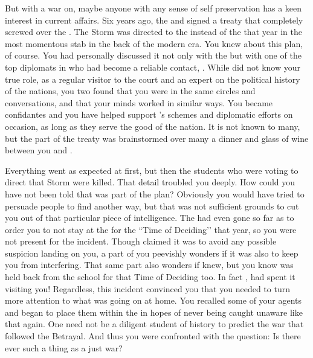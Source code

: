 \documentclass[char]{GL2020}
\begin{document}
But with a war on, maybe anyone with any sense of self preservation has a keen interest in current affairs. Six years ago, the \pFarm{} and \pTech{} signed a treaty that completely screwed over the \pShippies{}. The Storm was directed to the \pShip{} instead of the \pTech{} that year in the most momentous stab in the back of the modern era. You knew about this plan, of course.  You had personally discussed it not only with the \cQueen{\Monarch} but with one of the top diplomats in \pFarm{} who had become a reliable contact, \cEvil{\full}. While \cEvil{\they} did not know your true role, as a regular visitor to the court and an expert on the political history of the nations, you two found that you were in the same circles and conversations, and that your minds worked in similar ways. You became confidantes and you have helped support \cEvil{}’s schemes and diplomatic efforts on occasion, as long as they serve the good of the nation. It is not known to many, but the \pFarm{} part of the treaty was brainstormed over many a dinner and glass of wine between you and \cEvil{}.

Everything went as expected at first, but then the students who were voting to direct that Storm were killed. That detail troubled you deeply. How could you have not been told that was part of the plan? Obviously you would have tried to persuade people to find another way, but that was not sufficient grounds to cut you out of that particular piece of intelligence. The \cQueen{\Monarch} had even gone so far as to order you to not stay at the \pSc{} for the ``Time of Deciding’’ that year, so you were not present for the incident. Though \cQueen{\they} claimed it was to avoid any possible suspicion landing on you, a part of you peevishly wonders if it was also to keep you from interfering. That same part also wonders if \cEvil{} knew, but you know \cEvil{} was held back from the school for that Time of Deciding too. In fact \cEvil{}, had spent it visiting you! Regardless, this incident convinced you that you needed to turn more attention to what was going on at home. You recalled some of your agents and began to place them within the \pFarm{} in hopes of never being caught unaware like that again. One need not be a diligent student of history to predict the war that followed the Betrayal. And thus you were confronted with the question: Is there ever such a thing as a just war?
\end{document}
